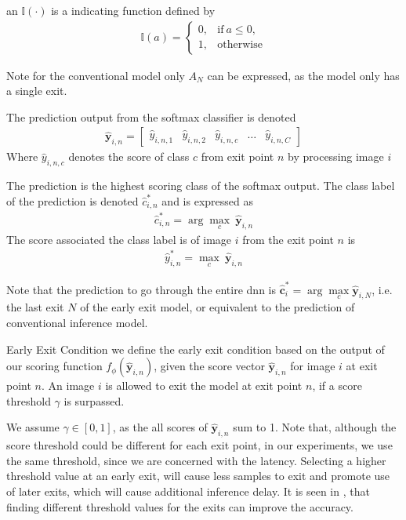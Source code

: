 \begin{enumdescript}
		an $ \mathbb{I(\cdot)}  $ is a indicating function defined by
		\begin{align}
		\mathbb{I}(a)= \begin{cases}
		0, & \mathrm{if\:} a \leq 0, \\
		1, & \mathrm{otherwise}
		\end{cases}
		\end{align}
		    		
		Note for the conventional model only $ A_N $ can be expressed, as the model only has a single exit.
		
		The prediction output from the softmax classifier is denoted
		\begin{align}
			\mathbf{\hat{y}}_{i,n} = \left[\begin{array}{ccccc}\hat{y}_{i,n,1} & \hat{y}_{i,n,2} & \hat{y}_{i,n,c} & \dots & \hat{y}_{i,n,C}\end{array}\right]
		\end{align}
		Where $ \hat{y}_{i,n,c} $ denotes the score of class $ c $ from exit point $ n $ by processing image $ i $
		
		The prediction is the highest scoring class of the softmax output. The class label of the prediction is denoted $ \hat{c}^*_{i,n} $ and is expressed as
		\begin{align}
		\hat{c}^*_{i,n} = \arg \underset{c}{\max}\: \mathbf{\hat{y}}_{i,n}
		\end{align}
		The score associated the class label is of image $ i $ from the exit point $ n $ is
		\begin{align}
		\hat{y}^*_{i,n} = \underset{c}{\max}\: \mathbf{\hat{y}}_{i,n}
		\end{align}
	
		Note that the prediction to go through the entire \gls{dnn} is $ \bm{\hat{c}}^*_i  = \arg \underset{c}{\max} \bm{\hat{y}}_{i,N} $, i.e. the last exit $ N $ of the early exit model, or equivalent to the prediction of conventional inference model.
  
		\item[Early Exit Condition] we define the early exit condition based on the output of our scoring function $ f_\phi(\bm{\hat{y}}_{i,n}) $, given the score vector $ \bm{\hat{y}}_{i,n} $ for image $ i $ at exit point $ n $. An image $ i $ is allowed to exit the model at exit point $ n $, if a score threshold $ \gamma $ is surpassed. 
		
		We assume $	\gamma \in \left[0,1\right] $, as the all scores of  $ \bm{\hat{y}}_{i,n} $ sum to 1. Note that, although the score threshold could be different for each exit point, in our experiments, we use the same threshold, since we are concerned with the latency. Selecting a higher threshold value at an early exit, will cause less samples to exit and promote use of later exits, which will cause additional inference delay. It is seen in \cite{teerapittayanon_finding_2018}, that finding different threshold values for the exits can improve the accuracy.
		

\end{enumdescript}
